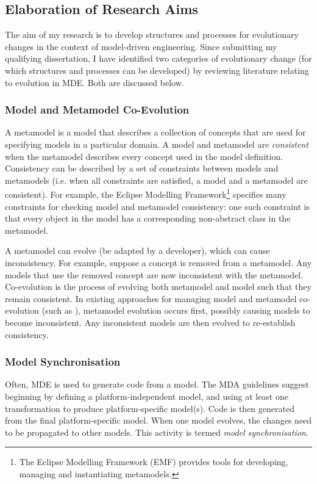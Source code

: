 \subsection{Elaboration of Research Aims}
\label{sub:elaboration}
The aim of my research is to develop structures and processes for evolutionary changes in the context of model-driven engineering. Since submitting my qualifying dissertation, I have identified two categories of evolutionary change (for which structures and processes can be developed) by reviewing literature relating to evolution in MDE. Both are discussed below.

\subsubsection{Model and Metamodel Co-Evolution} %
\label{ssub:model_and_metamodel_co_evolution}
A metamodel is a model that describes a collection of concepts that are used for specifying models in a particular domain. A model and metamodel are \emph{consistent} when the metamodel describes every concept used in the model definition. Consistency can be described by a set of constraints between models and metamodels (i.e. when all constraints are satisfied, a model and a metamodel are consistent). For example, the Eclipse Modelling Framework\footnote{The Eclipse Modelling Framework (EMF) \cite{emf} provides tools for developing, managing and instantiating metamodels.} specifies many constraints for checking model and metamodel consistency: one such constraint is that every object in the model has a corresponding non-abstract class in the metamodel.

A metamodel can evolve (be adapted by a developer), which can cause inconsistency. For example, suppose a concept is removed from a metamodel. Any models that use the removed concept are now inconsistent with the metamodel. Co-evolution is the process of evolving both metamodel and model such that they remain consistent. In existing approaches for managing model and metamodel co-evolution (such as \cite{herrmannsdoerfer08cope,cicchetti08automating}), metamodel evolution occurs first, possibly causing models to become inconsistent. Any inconsistent models are then evolved to re-establish consistency.


\subsubsection{Model Synchronisation} %
\label{ssub:model_synchronisation}
Often, MDE is used to generate code from a model. The MDA guidelines suggest beginning by defining a platform-independent model, and using at least one transformation to produce platform-specific model(s). Code is then generated from the final platform-specific model. When one model evolves, the changes need to be propagated to other models. This activity is termed \textit{model synchronisation}.

